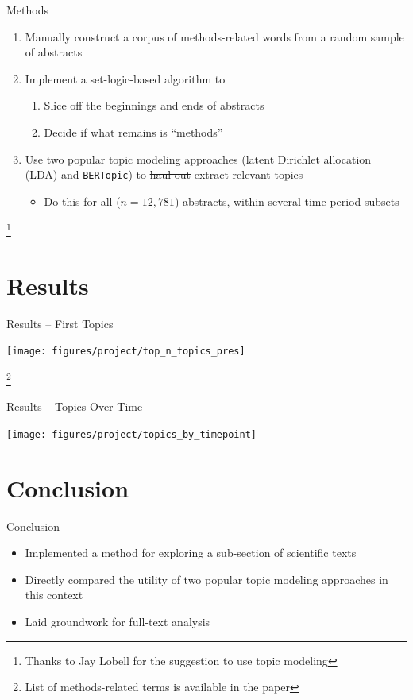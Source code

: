 \documentclass[aspectratio=169]{beamer}
\newcommand\blfootnote[1]{%
	\begingroup
	\renewcommand\thefootnote{}\footnote{#1}%
	\addtocounter{footnote}{-1}%
	\endgroup
}
\begin{document}
\begin{frame}{Methods}
	\begin{enumerate}
		\item Manually construct a corpus of methods-related words from a random sample of abstracts
		\item Implement a set-logic-based algorithm to
			\begin{enumerate}
				\item Slice off the beginnings and ends of abstracts
				\item Decide if what remains is ``methods''
			\end{enumerate}
		\item Use two popular topic modeling approaches (latent Dirichlet allocation (LDA)\cite{Blei2003} and \texttt{BERTopic}\cite{Grootendorst2022a}) to \sout{haul out} extract relevant topics
		\begin{itemize}
			\item Do this for all ($n=12,781$) abstracts, within several time-period subsets
		\end{itemize}
	\end{enumerate}
	
	\blfootnote{Thanks to Jay Lobell for the suggestion to use topic modeling}
\end{frame}

\section{Results}



\begin{frame}{Results -- First Topics}

	
	\texttt{[image: figures/project/top\_n\_topics\_pres]}
	
	\blfootnote{List of methods-related terms is available in the paper}
\end{frame}

\begin{frame}{Results -- Topics Over Time}
	
	\texttt{[image: figures/project/topics\_by\_timepoint]}
\end{frame}

\section{Conclusion}

\begin{frame}{Conclusion}
	\begin{itemize}
		\item Implemented a method for exploring a sub-section of scientific texts
		\item Directly compared the utility of two popular topic modeling approaches in this context
		\item Laid groundwork for full-text analysis
	\end{itemize}
\end{frame}
\end{document}
